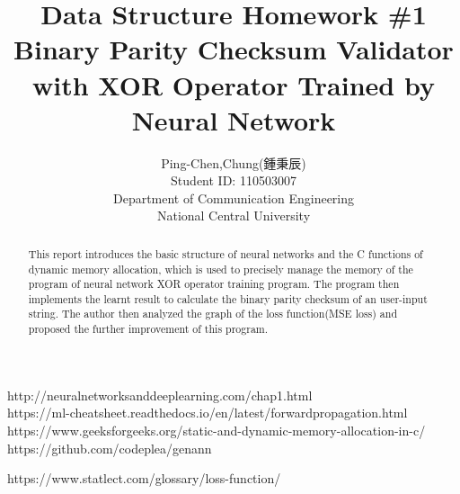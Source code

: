 


\begin{CJK*}{UTF8}{bsmi}


\title{Data Structure Homework \#1 \\ Binary Parity Checksum Validator \\with XOR Operator Trained by \\  Neural Network}
\author{Ping-Chen,Chung(鍾秉辰)\\Student ID: 110503007\\Department of Communication Engineering\\National Central University}

	\maketitle
	\tableofcontents
	\newpage
	\begin{abstract}
	This report introduces the basic structure of neural networks and the C functions of dynamic memory allocation, which is used to precisely manage the memory of the program of neural network XOR operator training program. The program then implements the learnt result to calculate the binary parity checksum of an user-input string. The author then analyzed the graph of the loss function(MSE loss) and proposed the further improvement of this program. 
	    
	\end{abstract}
	\newpage
	\newpage
	\newpage
	\newpage
	



	
	
	
% 	




	\begin{thebibliography}{99}  
	 http://neuralnetworksanddeeplearning.com/chap1.html\\
	
		https://ml-cheatsheet.readthedocs.io/en/latest/forwardpropagation.html
		https://www.geeksforgeeks.org/static-and-dynamic-memory-allocation-in-c/
	https://github.com/codeplea/genann

	https://www.statlect.com/glossary/loss-function/
		
		
	
		
	\end{thebibliography} 


\end{CJK*}

